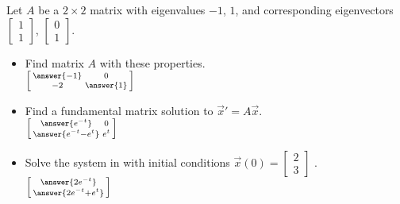 \documentclass{ximera}
\begin{document}
\begin{exercise}
    Let $A$ be a $2 \times 2$ matrix with eigenvalues $-1$, $1$, and corresponding eigenvectors
    $\left[ 
        \begin{smallmatrix}
            1 \\
            1
        \end{smallmatrix} 
    \right]$,
    $\left[ 
        \begin{smallmatrix}
            0 \\
            1
        \end{smallmatrix} 
    \right]$.
    \begin{itemize}
        \item Find matrix $A$ with these properties.\\
            $\left[\begin{smallmatrix} \answer{-1} & 0 \\ -2 & \answer{1} \end{smallmatrix}\right]$
        \item Find a fundamental matrix solution to ${\vec{x}}' = A \vec{x}$.\\
            $\left[\begin{smallmatrix} \answer{e^{-t}} & 0 \\ \answer{e^{-t} - e^t} & e^t \end{smallmatrix}\right]$
        \item Solve the system in with initial conditions $\vec{x}(0) =
        \left[ \begin{smallmatrix}
            2 \\
            3
        \end{smallmatrix} \right]$ .\\
        $\left[\begin{smallmatrix} \answer{2e^{-t}} \\ \answer{2e^{-t} + e^t} \end{smallmatrix}\right]$
    \end{itemize}
\end{exercise}
\end{document}
